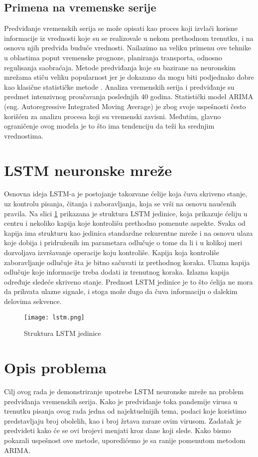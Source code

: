 \documentclass[a4paper]{article}
\begin{document}
\subsection{Primena na vremenske serije}
Predviđanje vremenskih serija se može opisati kao proces koji izvlači korisne informacije iz vrednosti koje su se realizovale u nekom prethodnom trenutku, i na osnovu njih predviđa buduće vrednosti. Nailazimo na veliku primenu ove tehnike u oblastima poput vremenske prognoze, planiranja transporta, odnosno regulisanja saobraćaja. Metode predviđanja koje su bazirane na neuronskim mrežama stiču veliku popularnost jer je dokazano da mogu biti podjednako dobre kao klasične statističke metode \cite{siami2018forecasting}. 
Analiza vremenskih serija i predviđanje su predmet intenzivnog proučavanja poslednjih 40 godina. Statistički model ARIMA (eng. Autoregressive Integrated Moving Average) je zbog svoje uspešnosti često korišćen za analizu procesa koji su vremenski zavisni. Međutim, glavno ograničenje ovog modela je to što ima tendenciju da teži ka srednjim vrednostima. 

\section{LSTM neuronske mreže}
Osnovna ideja LSTM-a je postojanje takozvane ćelije koja čuva skriveno stanje, uz kontrolu pisanja, čitanja i zaboravljanja, koja se vrši na osnovu naučenih pravila. Na slici \ref{fig:jedinica} prikazana je struktura LSTM jedinice, koja prikazuje ćeliju u centru i nekoliko kapija koje kontrolišu prethodno pomenute aspekte. Svaka od kapija ima strukturu kao jedinica standardne rekurentne mreže i na osnovu ulaza koje dobija i pridruženih im parametara odlučuje o tome da li i u kolikoj meri dozvoljava izvršavanje operacije koju kontroliše. Kapija koja kontroliše zaboravljanje odlučuje šta je bitno sačuvati iz prethodnog koraka. Ulazna kapija odlučuje koje informacije treba dodati iz trenutnog koraka. Izlazna kapija određuje sledeće skriveno stanje. Prednost LSTM jedinice je to što ćelija ne mora da prihvata ulazne signale, i stoga može dugo da čuva informaciju o dalekim delovima sekvence. 

\begin{figure}[htp]
    \centering
    \texttt{[image: lstm.png]}
    \caption{Struktura LSTM jedinice}
    \label{fig:jedinica}
\end{figure}



\section{Opis problema}
Cilj ovog rada je demonstriranje upotrebe LSTM neuronske mreže na problem predviđanja vremenskih serija. Kako je predviđanje toka pandemije virusa u trenutku pisanja ovog rada jedna od najektuelnijih tema, podaci koje koristimo predstavljaju broj obolelih, kao i broj žrtava zaraze ovim virusom. Zadatak je predvideti kako će se ovi brojevi menjati kroz dane koji slede. Kako bismo pokazali uspešnost ove metode, uporedićemo je sa ranije pomenutom metodom ARIMA. 
\end{document}

